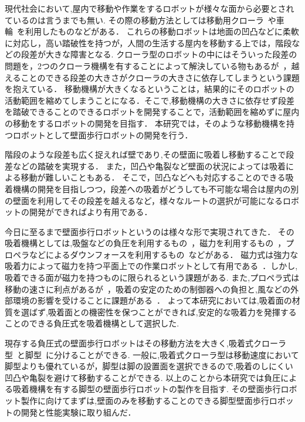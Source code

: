 \documentclass[uplatex,dvipdfmx]{jlreq}
\begin{document}
現代社会において,屋内で移動や作業をするロボットが様々な面から必要とされているのは言うまでも無い.
その際の移動方法としては移動用クローラ~\cite{小柳栄次2010サブクローラを持つレスキューロボット}や車輪~\cite{尾崎功一20082p2}を利用したものなどがある．
これらの移動ロボットは地面の凹凸などに柔軟に対応し，高い踏破性を持つが，人間の生活する屋内を移動する上では，階段などの段差が大きな障害となる.
クローラ型のロボットの中にはそういった段差の問題を，2つのクローラ機構を有することによって解決している物もあるが~\cite{小柳栄次2010サブクローラを持つレスキューロボット}，越えることのできる段差の大きさがクローラの大きさに依存してしまうという課題を抱えている．
移動機構が大きくなるということは，結果的にそのロボットの活動範囲を縮めてしまうことになる．そこで,移動機構の大きさに依存せず段差を踏破できることのできるロボットを開発することで，活動範囲を縮めずに屋内の移動をするロボットの開発を目指す．
本研究では，そのような移動機構を持つロボットとして壁面歩行ロボットの開発を行う．

階段のような段差も広く捉えれば壁であり,その壁面に吸着し移動することで段差などの踏破を実現する．
また，凹凸や亀裂など壁面の状況によっては吸着による移動が難しいこともある．
そこで，凹凸などへも対応することのできる吸着機構の開発を目指しつつ，段差への吸着がどうしても不可能な場合は屋内の別の壁面を利用してその段差を越えるなど，様々なルートの選択が可能になるロボットの開発ができればより有用である．

今日に至るまで壁面歩行ロボットというのは様々な形で実現されてきた．
その吸着機構としては,吸盤などの負圧を利用するもの~\cite{広瀬茂男1991四足壁面移動ロボット}，磁力を利用するもの~\cite{高田洋吾2013立体的な環境で活動できる橋梁検査ロボットの開発}，プロペラなどによるダウンフォースを利用するもの~\cite{weko_4205_1}などがある．
磁力式は強力な吸着力によって磁力を持つ平面上での作業ロボットとして有用である~\cite{高田洋吾2013立体的な環境で活動できる橋梁検査ロボットの開発}．しかし,吸着できる面が磁力を持つものに限られるという課題がある.
また,プロペラ式は移動の速さに利点があるが~\cite{weko_4205_1}，吸着の安定のための制御器への負担と,風などの外部環境の影響を受けることに課題がある~\cite{西亮1991推進力による壁面移動ロボットの研究,鈴木隆宏2009g1501}．
よって本研究においては,吸着面の材質を選ばず,吸着面との機密性を保つことができれば,安定的な吸着力を発揮することのできる負圧式を吸着機構として選択した.

現存する負圧式の壁面歩行ロボットはその移動方法を大きく,吸着式クローラ型~\cite{福田敏男1994壁面走行ロボットの研究}と脚型~\cite{広瀬茂男1991四足壁面移動ロボット}に分けることができる.
一般に,吸着式クローラ型は移動速度において脚型よりも優れているが\cite{福田敏男1992壁面走行ロボッ}，脚型は脚の設置面を選択できるので,吸着のしにくい凹凸や亀裂を避けて移動することができる.
以上のことから本研究では負圧による吸着機構を有する脚型の壁面歩行ロボットの製作を目指す.
その壁面歩行ロボット製作に向けてまずは,壁面のみを移動することのできる脚型壁面歩行ロボットの開発と性能実験に取り組んだ．
\end{document}
